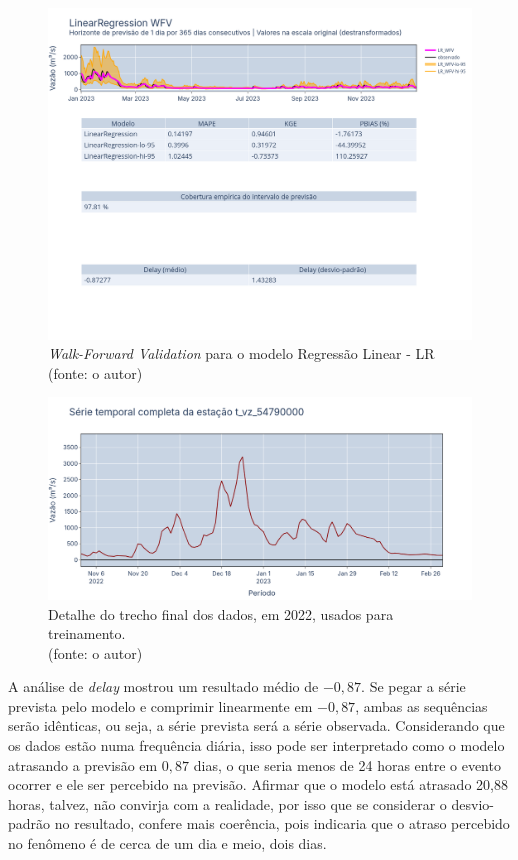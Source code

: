 \begin{figure}[!h]
	\centering
	\includegraphics[scale=0.33]{Figuras/jequiti/resultados/LR_WFV_LOG.png}
	\caption{\textit{Walk-Forward Validation} para o modelo Regressão Linear - LR\\(fonte: o autor)}
	\label{fig:jequiti_LR_WFV_LOG}
\end{figure}

\begin{figure}[!h]
	\centering
	\includegraphics[scale=0.33]{Figuras/jequiti/resultados/LR_final_2022_detalhe.png}
	\caption{Detalhe do trecho final dos dados, em 2022, usados para treinamento.\\(fonte: o autor)}
	\label{fig:jequiti_LR_final_2022_detalhe}
\end{figure}

A análise de \textit{delay} mostrou um resultado médio de $-0,87$. Se pegar a série prevista pelo modelo e comprimir linearmente em $-0,87$, ambas as sequências serão idênticas, ou seja, a série prevista será a série observada. Considerando que os dados estão numa frequência diária, isso pode ser interpretado como o modelo atrasando a previsão em $0,87$ dias, o que seria menos de 24 horas entre o evento ocorrer e ele ser percebido na previsão. Afirmar que o modelo está atrasado 20,88 horas, talvez, não convirja com a realidade, por isso que se considerar o desvio-padrão no resultado, confere mais coerência, pois indicaria que o atraso percebido no fenômeno é de cerca de um dia e meio, dois dias.


